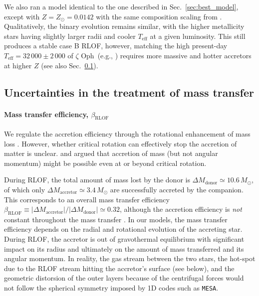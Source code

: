 \documentclass[twocolumn,twocolappendix,trackchanges]{aastex63}
\DeclareRobustCommand{\Secref}[1]{Sec.~\ref{#1}}
\newcommand{\zoph}{$\zeta$ Oph}
\begin{document}
We also ran a model identical to the one described in
\Secref{sec:best_model}, except with $Z=Z_\odot=0.0142$
\citep{asplund:09} with the same composition scaling from
\cite{grevesse:98}.  Qualitatively, the binary evolution remains
similar, with the higher metallicity stars having slightly larger
radii and cooler $T_\mathrm{eff}$ at a given luminosity. This still
produces a stable case B RLOF, however, matching the high present-day
$T_\mathrm{eff}=32\,000\pm2\,000$ of \zoph\ (e.g.,
) requires more massive and hotter accretors
at higher $Z$ (see also \Secref{sec:bin_param}).

\subsection{Uncertainties in the treatment of mass transfer}
\label{sec:bin_param}

\paragraph{Mass transfer efficiency, $\beta_\mathrm{RLOF}$}
We regulate the accretion efficiency through the rotational
enhancement of mass loss \citep[e.g.,][]{langer:98, petrovic:05, wang:20}.  However, whether
critical rotation can effectively stop the accretion of matter is
unclear. \cite{popham:91} and \cite{paczynski:91} argued that
accretion of mass (but not angular momentum) might be possible even at
or beyond critical rotation.

During RLOF, the total amount of mass lost by the donor is
$\Delta M_\mathrm{donor} \simeq 10.6\,M_\odot$, of which only
$\Delta M_\mathrm{accretor}\simeq 3.4\,M_\odot$ are successfully
accreted by the companion. This corresponds to an overall mass
transfer efficiency
$\beta_\mathrm{RLOF}\equiv |\Delta M_\mathrm{accretor}|/|\Delta M_\mathrm{donor}| \simeq 0.32$,
although the accretion efficiency is \emph{not} constant throughout
the mass transfer \citep[e.g.,][]{vanrensbergen:06}. In our models,
the mass transfer efficiency depends on the radial and rotational
evolution of the accreting star. During RLOF, the accretor is out of
gravothermal equilibrium with significant impact on its radius and
ultimately on the amount of mass transferred and its angular
momentum. In reality, the gas stream between the two stars, the
hot-spot due to the RLOF stream hitting the accretor's surface (see
below), and the geometric distorsion of the outer layers because of
the centrifugal forces would not follow the spherical symmetry imposed
by 1D codes such as \texttt{MESA}.
\end{document}
